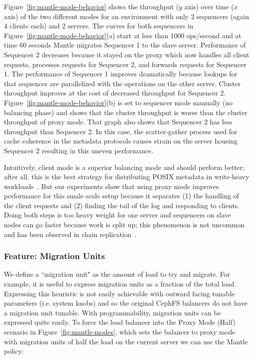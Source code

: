 \documentclass[preprint]{sigplanconf-eurosys}
\begin{document}
Figure~\ref{fig:mantle-mode-behavior} shows the throughput (\(y\) axis) over
time (\(x\) axis) of the two different modes for an environment with only 2
sequencers (again 4 clients each) and 2 servers. The curves for both sequencers
in Figure~\ref{fig:mantle-mode-behavior}(a) start at less than 1000 ops/second
and at time 60 seconds Mantle migrates Sequencer 1 to the slave server.
Performance of Sequencer 2 decreases because it stayed on the proxy which now
handles all client requests, processes requests for Sequencer 2, and forwards
requests for Sequencer 1. The performance of Sequencer 1 improves dramatically
because lookups for that sequencer are parallelized with the operations on the
other server. Cluster throughput improves at the cost of decreased throughput
for Sequencer 2.  Figure~\ref{fig:mantle-mode-behavior}(b) is set to sequencer
mode manually (no balancing phase) and shows that the cluster throughput is
worse than the cluster throughput of proxy mode. That graph also shows that
Sequencer 2 has less throughput than Sequencer 2. In this case, the
scatter-gather process used for cache coherence in the metadata protocols
causes strain on the server housing Sequencer 2 resulting in this uneven
performance. 

Intuitively, client mode is a superior balancing mode and should perform
better; after all, this is the best strategy for distributing POSIX metadata in
write-heavy workloads~\cite{ren:sc2014-indexfs, patil:fast2011-giga,
sevilla:sc15-mantle}.  But our experiments show that using proxy mode improves
performance for this smale scale setup because it separates (1) the handling of
the client requests and (2) finding the tail of the log and responding to
clients.  Doing both steps is too heavy weight for one server and sequencers on
slave nodes can go faster because work is split up; this phenomenon is not
uncommon and has been observed in chain replication~\cite{CITEME}.

\subsubsection{Feature: Migration Units}
\label{sec:feature-migration-units}

We define a ``migration unit" as the amount of load to try and migrate.  For
example, it is useful to express migration units as a fraction of the total
load.  Expressing this heuristic is not easily achievable with outward facing
tunable parameters (i.e. system knobs) and so the original CephFS balancers do
not have a migration unit tunable.  With programmability, migration units can
be expressed quite easily. To force the load balancer into the Proxy Mode (Half)
scenario in Figure~\ref{fig:mantle-modes}, which sets the balancer to proxy
mode with migration units of half the load on the current server we can use the
Mantle policy:\\
\end{document}
